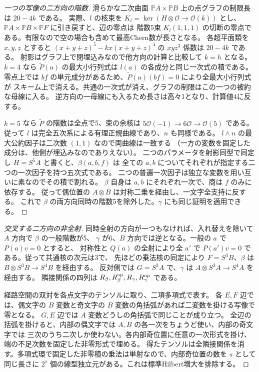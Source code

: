 \begin{proof}[一つの写像の二方向の階数]
滑らかな二次曲面 $\mathbb P A\times\mathbb P B$ 上の点グラフの制限長は $20-4k$ である。
実際、$l$ の核束を $K_l=\ker(H\otimes\mathcal O\to\mathcal O(k))$ とし、
$\mathbb P A\times\mathbb P B\times\mathbb P F$ に引き戻すと、辺の零点は
階数5束 $K_l(1,1,1)$ の切断の零点である。有限なので空の場合も含めて最高Chern数が長さとなる。
各超平面類を $x,y,z$ とすると $(x+y+z)^5-kx(x+y+z)^4$ の $xyz^3$ 係数は $20-4k$ である。
射影はグラフ上で閉埋込みなので他方向の計算と比較して $k=h$ となる。
$k=4$ なら $\widetilde P(a)$ の最大小行列式は $l(a)$ の各成分と同じ一次式の積である。
零点上では $bf$ の単元成分があるため、$\widetilde P(a)(bf)=0$ により全最大小行列式が
スキーム上で消える。共通の一次式が消え、グラフの制限はこの一つの被約な母線に入る。
逆方向の一母線にも入るため長さは高々1となり、計算値4に反する。

$k=5$ なら $\widetilde P$ の階数は全点で5、束の余核は
$5\mathcal O(-1)\to6\mathcal O\to\mathcal O(5)$ である。
従って $l$ は完全五次系による有理正規曲線であり、$n$ も同様である。
$l\wedge n$ の最大公約因子は二次数 $(1,1)$ なので両曲線は一致する
（一方の変数を固定した成分は、他側が埋込みなのでありえない）。
二つのパラメータを射影同型で同定し $H=S^5 A$ と書くと、$\beta(a,b,f)$ は
全ての $a,b$ についてそれぞれが指定する二つの一次因子を持つ五次式である。
二つの普遍一次因子は独立な変数を用い互いに素なのでその積で割れる。
$\beta$ 自身は $a,b$ にそれぞれ一次で、商は $f$ のみに依存する。
従って偶位置の $A\otimes B$ は対称二乗を経由し、一文字全支持に反する。
これで $\beta$ の両方向同時の階数5を除外した。$\gamma$ にも同じ証明を適用できる。
\end{proof}

\begin{proof}[交叉する二方向の非全射]
同時全射の方向が一つもなければ、入れ替えを除いて $A$ 方向で $\beta$ の一般階数が5、
$\gamma$ が6、$B$ 方向では逆となる。一般の $a$ で $P(a)v=0$ とすると、
対称性と $Q(a)$ の全射により全 $a'$ で $P(a')v=0$ である。従って共通核の次元は3で、
先ほどの乗法核の同定により $F=S^3B$、$\beta$ は $B\otimes S^3B\to S^4B$ を経由する。
反対側では $G=S^3A$ で、$\gamma$ は $A\otimes S^3A\to S^4A$ を経由する。
隣接関係の四列は $R_\beta,R_\beta^{\rm op},R_\gamma,R_\gamma^{\rm op}$ である。

経路空間の双対を各点文字のテンソルに取り、二項多項式で表す。
各 $E,F$ 辺では、偶文字の $B$ 変数と奇文字の $B$ 変数の角括弧があれば二変数を掛ける写像で零となる。
$G,E$ 辺では $A$ 変数どうしの角括弧で同じことが成り立つ。
全辺の括弧を掛けると、内部の偶文字では $A,B$ の各一次をちょうど使い、内部の奇文字では
三次のうち二次しか使わない。各内部奇位置に任意の一次形式を掛け、端の不足次数を固定した非零形式で埋める。
得たテンソルは全隣接関係を消す。多項式環で固定した非零積の乗法は単射なので、内部奇位置の数を $s$ として
同じ長さに $2^s$ 個の線型独立元がある。これは標準Hilbert増大を排除する。
\end{proof}
